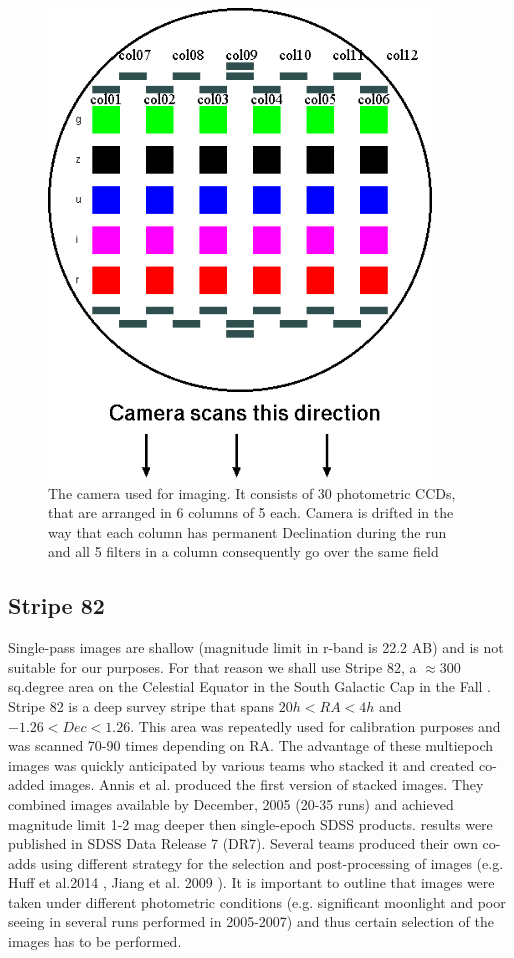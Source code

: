 \begin{figure}[!ht]
\centerline{\includegraphics[width=4in]{Figures/sdss_camera.png}}
\caption{The camera used for imaging. It consists of 30 photometric CCDs, that are arranged in 6 columns of 5 each. Camera is drifted in the way that each column has permanent Declination during the run and all 5 filters in a column consequently go over the same field}
\label{fig:sdss}
\end{figure}

\subsection{Stripe 82}
Single-pass images are shallow (magnitude limit in r-band is 22.2 AB) and is not suitable for our purposes. For that reason we shall use Stripe 82, a $\approx300$ sq.degree area on the Celestial Equator in the South Galactic Cap in the Fall \citep{Adelman-McCarthy2007}. Stripe 82 is a deep survey stripe that spans $20h < RA < 4h$ and $-1.26 < Dec < 1.26$. This area was repeatedly used for calibration purposes and was scanned 70-90 times depending on RA. The advantage of these multiepoch images was quickly anticipated by various teams who stacked it and created co-added images. Annis et al. \citep{Annis2014} produced the first version of stacked images. They combined images available by December, 2005 (20-35 runs) and achieved magnitude limit 1-2 mag deeper then single-epoch SDSS products. results were published in SDSS Data Release 7 (DR7). Several teams produced their own co-adds using different strategy for the selection and post-processing of images (e.g. Huff et al.2014 \citep{2014MNRAS.440.1296H}, Jiang et al. 2009 \citep{2009AJ....138..305J}). It is important to outline that images were taken under different photometric conditions (e.g. significant moonlight and poor seeing in several runs performed in 2005-2007) and thus certain selection of the images has to be performed.

